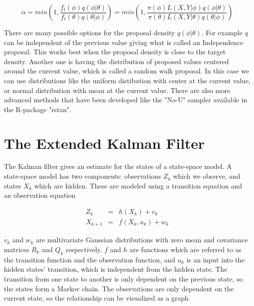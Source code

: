 $$
    \alpha = min \left( 1, \frac{f_t(\phi)q(\phi|\theta)}{f_t(\theta)q(\theta|\phi)} \right) = min \left( 1, \frac{\pi(\phi)L(X,Y|\phi)q(\phi|\theta)}{\pi(\theta)L(X,Y|\theta)q(\theta|\phi)} \right)
$$

There are many possible options for the proposal density $q(\phi|\theta)$. For example $q$ can be independent of the previous value giving what is called an Independence proposal. This works best when the proposal density is close to the target density. Another one is having the distribution of proposed values centered around the current value, which is called a random walk proposal. In this case we can use distributions like the uniform distibution with center at the current value, or normal distribution with mean at the current value. There are also more advanced methods that have been developed like the "No-U" sampler available in the R-package "rstan".


\section{The Extended Kalman Filter}
\label{sec: EKF}

The Kalman filter gives an estimate for the states of a state-space model. A state-space model has two components: observations $Z_k$ which we observe, and states $X_k$ which are hidden. These are modeled using a transition equation and an observation equation

$$
\begin{array}{lcl}
Z_k &=& h(X_k) + v_k
\\
X_{k+1} &=& f(X_k, u_k) + w_k
\end{array}
$$

 $v_k$ and $w_k$ are multivariate Gaussian distributions with zero mean and covariance matrices $R_k$ and $Q_k$ respectively. $f$ and $h$ are functions which are referred to as the transition function and the observation function, and $u_k$ is an input into the hidden states' transition, which is independent from the hidden state. The transition from one state to another is only dependent on the previous state, so the states form a Markov chain. The observations are only dependent on the current state, so the relationship can be visualized as a graph

 \

